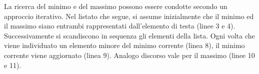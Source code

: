 La ricerca del minimo e del massimo possono essere condotte secondo un approccio iterativo. Nel listato che segue, si assume inizialmente che il minimo ed il massimo siano entrambi rappresentati dall'elemento di testa (linee 3 e 4). Successivamente si scandiscono in sequenza gli elementi della lista. Ogni volta che viene individuato un elemento minore del minimo corrente (linea 8), il minimo corrente viene aggiornato (linea 9). Analogo discorso vale per il massimo (linee 10 e 11).

\enablelstnum
{}
